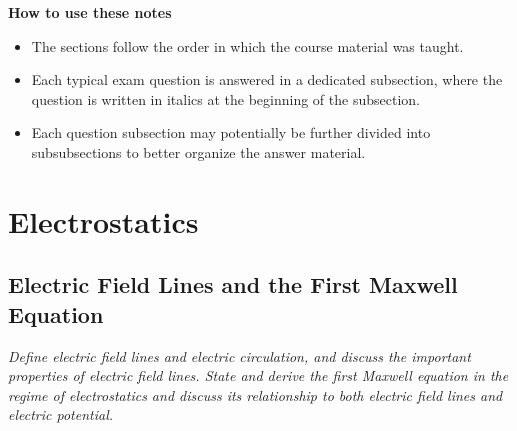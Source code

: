 \documentclass[11pt, a4paper]{article}
\begin{document}
\vspace{5mm}
\textbf{How to use these notes}
\begin{itemize}
    \item The sections follow the order in which the course material was taught.

    \item Each typical exam question is answered in a dedicated subsection, where the question is written in italics at the beginning of the subsection.
    
    \item Each question subsection may potentially be further divided into subsubsections to better organize the answer material.

\end{itemize}


\newpage

\pagestyle{empty}  %
\tableofcontents

\newpage

\pagestyle{fancy}  %

\section{Electrostatics}

\subsection{Electric Field Lines and the First Maxwell Equation}
\textit{Define electric field lines and electric circulation, and discuss the important properties of electric field lines. State and derive the first Maxwell equation in the regime of electrostatics and discuss its relationship to both electric field lines and electric potential.}
    
\end{document}
